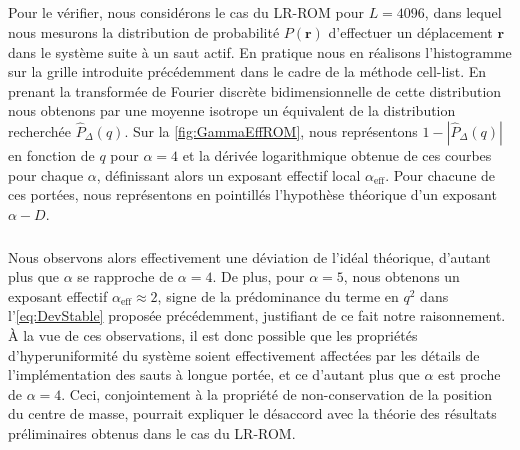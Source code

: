 \subparagraph{}Pour le vérifier, nous considérons le cas du LR-ROM pour $L=4096$, dans lequel nous mesurons la distribution de probabilité $P(\mathbf{r})$ d'effectuer un déplacement $\mathbf{r}$ dans le système suite à un saut actif. En pratique nous en réalisons l'histogramme sur la grille introduite précédemment dans le cadre de la méthode cell-list. En prenant la transformée de Fourier discrète bidimensionnelle de cette distribution nous obtenons par une moyenne isotrope un équivalent de la distribution recherchée $\hat{P}_\Delta (q)$. Sur la \autoref{fig:GammaEffROM}, nous représentons $1-|\hat{P}_\Delta (q)|$ en fonction de $q$ pour $\alpha=4$ et la dérivée logarithmique obtenue de ces courbes pour chaque $\alpha$, définissant alors un exposant effectif local $\alpha_\text{eff}$. Pour chacune de ces portées, nous représentons en pointillés l'hypothèse théorique d'un exposant $\alpha-D$.

\subparagraph{}Nous observons alors effectivement une déviation de l'idéal théorique, d'autant plus que $\alpha$ se rapproche de $\alpha = 4$. De plus, pour $\alpha=5$, nous obtenons un exposant effectif $\alpha_\text{eff}\approx2$, signe de la prédominance du terme en $q^2$ dans l'\autoref{eq:DevStable} proposée précédemment, justifiant de ce fait notre raisonnement.
\`A la vue de ces observations, il est donc possible que les propriétés d'hyperuniformité du système soient effectivement affectées par les détails de l'implémentation des sauts à longue portée, et ce d'autant plus que $\alpha$ est proche de $\alpha=4$. Ceci, conjointement à la propriété de non-conservation de la position du centre de masse, pourrait expliquer le désaccord avec la théorie des résultats préliminaires obtenus dans le cas du LR-ROM.

%

